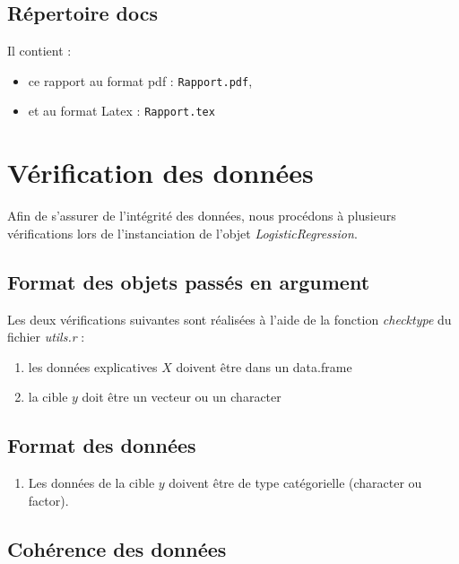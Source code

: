 \documentclass[10pt,french]{report}
\begin{document}
	\subsection{Répertoire docs}

	Il contient :
	\begin{itemize}
		\item ce rapport au format pdf : \texttt{Rapport.pdf},
		\item et au format Latex : \texttt{Rapport.tex}
	\end{itemize}

	\section{Vérification des données}
	Afin de s'assurer de l'intégrité des données, nous procédons à plusieurs vérifications lors de l'instanciation de l'objet \textit{LogisticRegression}.

	\subsection{Format des objets passés en argument}

	Les deux vérifications suivantes sont réalisées à l'aide de la fonction \textit{check\textunderscore type} du fichier \textit{utils.r} :

	\begin{enumerate}
		\item les données explicatives $X$ doivent être dans un data.frame
		\item la cible $y$ doit être un vecteur ou un character
	\end{enumerate}

	\subsection{Format des données}

	\begin{enumerate}
		\item Les données de la cible $y$ doivent être de type catégorielle (character ou factor).
	\end{enumerate}

	\subsection{Cohérence des données}
\end{document}
